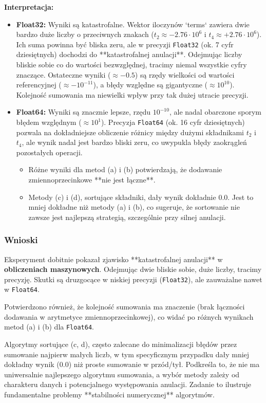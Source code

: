 \documentclass[11pt, a4paper]{article}
\begin{document}
\noindent \textbf{Interpretacja:}
\begin{itemize}
    \item \textbf{Float32:} Wyniki są katastrofalne. Wektor iloczynów `terms` zawiera dwie bardzo duże liczby o przeciwnych znakach ($t_2 \approx -2.76 \cdot 10^6$ i $t_4 \approx +2.76 \cdot 10^6$). Ich suma powinna być bliska zeru, ale w precyzji \texttt{Float32} (ok. 7 cyfr dziesiętnych) dochodzi do **katastrofalnej anulacji**. Odejmując liczby bliskie sobie co do wartości bezwzględnej, tracimy niemal wszystkie cyfry znaczące. Ostateczne wyniki ($\approx -0.5$) są rzędy wielkości od wartości referencyjnej ($ \approx -10^{-11}$), a błędy względne są gigantyczne ($ \approx 10^{10}$). Kolejność sumowania ma niewielki wpływ przy tak dużej utracie precyzji.
    
    \item \textbf{Float64:} Wyniki są znacznie lepsze, rzędu $10^{-10}$, ale nadal obarczone sporym błędem względnym ($ \approx 10^1$). Precyzja \texttt{Float64} (ok. 16 cyfr dziesiętnych) pozwala na dokładniejsze obliczenie różnicy między dużymi składnikami $t_2$ i $t_4$, ale wynik nadal jest bardzo bliski zeru, co uwypukla błędy zaokrągleń pozostałych operacji.
    \begin{itemize}
        \item Różne wyniki dla metod (a) i (b) potwierdzają, że dodawanie zmiennoprzecinkowe **nie jest łączne**.
        \item Metody (c) i (d), sortujące składniki, dały wynik dokładnie 0.0. Jest to mniej dokładne niż metody (a) i (b), co sugeruje, że sortowanie nie zawsze jest najlepszą strategią, szczególnie przy silnej anulacji.
    \end{itemize}
\end{itemize}

\subsubsection{Wnioski}
Eksperyment dobitnie pokazał zjawisko **katastrofalnej anulacji** w \textbf{obliczeniach maszynowych}. Odejmując dwie bliskie sobie, duże liczby, tracimy precyzję. Skutki są druzgocące w niskiej precyzji (\texttt{Float32}), ale zauważalne nawet w \texttt{Float64}.

Potwierdzono również, że kolejność sumowania ma znaczenie (brak łączności dodawania w arytmetyce zmiennoprzecinkowej), co widać po różnych wynikach metod (a) i (b) dla \texttt{Float64}.

Algorytmy sortujące (c, d), często zalecane do minimalizacji błędów przez sumowanie najpierw małych liczb, w tym specyficznym przypadku dały mniej dokładny wynik (0.0) niż proste sumowanie w przód/tył. Podkreśla to, że nie ma uniwersalnie najlepszego algorytmu sumowania, a wybór metody zależy od charakteru danych i potencjalnego występowania anulacji. Zadanie to ilustruje fundamentalne problemy **stabilności numerycznej** algorytmów.
\end{document}
